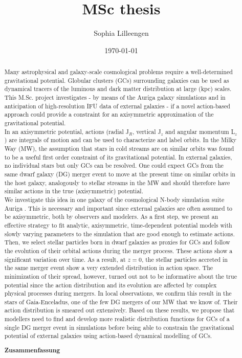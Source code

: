 \documentclass[a4paper,12pt,abstracton, twoside]{scrartcl}
\title{MSc thesis}
\author{Sophia Lilleengen}
\date{\today}
\begin{document}
 
\renewcommand{\bibname}{Bibliography}



\newpage
\thispagestyle{empty}
\begin{abstract}
\hspace{-12pt}Many astrophysical and galaxy-scale cosmological problems require a well-determined gravitational potential. Globular clusters (GCs) surrounding galaxies can be used as dynamical tracers of the luminous and dark matter distribution at large (kpc) scales. This M.Sc. project investigates - by means of the Auriga galaxy simulations and in anticipation of high-resolution IFU data of external galaxies - if a novel action-based approach could provide a constraint for an axisymmetric approximation of the gravitational potential. \\
In an axisymmetric potential, actions (radial J$_R$, vertical J$_z$ and angular momentum L$_z$) are integrals of motion and can be used to characterize and label orbits. In the Milky Way (MW), the assumption that stars in cold streams are on similar orbits was found to be a useful first order constraint of its gravitational potential. In external galaxies, no individual stars but only GCs can be resolved. One could expect GCs from the same dwarf galaxy (DG) merger event to move at the present time on similar orbits in the host galaxy, analogously to stellar streams in the MW and should therefore have similar actions in the true (axisymmetric) potential. \\
We investigate this idea in one galaxy of the cosmological N-body simulation suite Auriga \citep{AurigaGrand}. This is necessary and important since external galaxies are often assumed to be axisymmetric, both by observers and modelers. As a first step, we present an effective strategy to fit analytic, axisymmetric, time-dependent potential models with slowly varying parameters to the simulation that are good enough to estimate actions. \\
Then, we select stellar particles born in dwarf galaxies as proxies for GCs and follow the evolution of their orbital actions during the merger process. These actions show a significant variation over time. As a result, at $z=0$, the stellar particles accreted in the same merger event show a very extended distribution in action space. The minimization of their spread, however, turned out not to be informative about the true potential since the action distribution and its evolution are affected by complex physical processes during mergers. In local observations, we confirm this result in the stars of Gaia-Enceladus, one of the few DG mergers of our MW that we know of. Their action distribution is smeared out extensively. Based on these results, we propose that modellers need to find and develop more realistic distribution functions for GCs of a single DG merger event in simulations before being able to constrain the gravitational potential of external galaxies using action-based dynamical modelling of GCs.
\newpage
\thispagestyle{empty}
\begin{center}
 \textbf{Zusammenfassung}\end{center}


\end{abstract}
\end{document}
